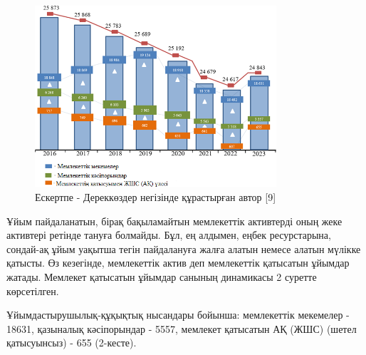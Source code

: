 \begin{figure}[H]
	\centering
	\includegraphics[width=0.8\textwidth]{media/ekon2/image2}
	\caption*{2 - сурет. Мемлекет қатысатын ұйымдар санының динамикасы}
	\caption*{Ескертпе - Дереккөздер негізінде құрастырған автор {[}9{]}}
\end{figure}

\begin{multicols}{2}
Ұйым пайдаланатын, бірақ бақыламайтын мемлекеттік активтерді оның жеке
активтері ретінде тануға болмайды. Бұл, ең алдымен, еңбек ресурстарына,
сондай-ақ ұйым уақытша тегін пайдалануға жалға алатын немесе алатын
мүлікке қатысты. Өз кезегінде, мемлекеттік актив деп мемлекеттік
қатысатын ұйымдар жатады. Мемлекет қатысатын ұйымдар санының динамикасы
2 суретте көрсетілген.

Ұйымдастырушылық-құқықтық нысандары бойынша: мемлекеттік мекемелер -
18631, қазыналық кәсіпорындар - 5557, мемлекет қатысатын АҚ (ЖШС) (шетел
қатысуынсыз) - 655 (2-кесте).
\end{multicols}

